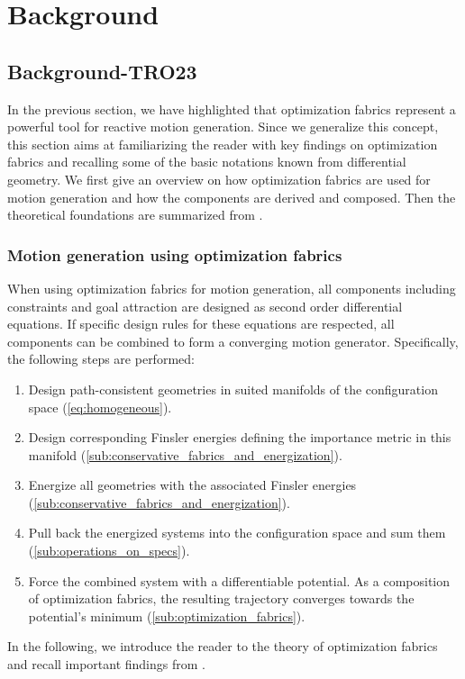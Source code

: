 \chapter{Background} %
\label{cha:background}

\section{Background-TRO23}%
\label{sec:mathematics}

In the previous section, we have highlighted that optimization fabrics represent a
powerful tool for reactive motion generation. Since we generalize this concept, this
section aims at familiarizing the reader with key findings on optimization fabrics and
recalling some of the basic notations known from differential geometry. 
We first give an overview on how optimization fabrics are used for motion generation
and how the components are derived and composed. Then the theoretical foundations
are summarized from \cite{Cheng2020,Ratliff2020}.

\subsection{Motion generation using optimization fabrics}%
\label{sub:trajectory_generation_using_optimization_fabrics}

When using optimization fabrics for motion generation, all components including constraints and 
goal attraction are designed as second order differential equations. If specific design
rules for these equations are respected, all components can be combined to 
form a converging motion generator. Specifically, the following steps are performed:
%
\begin{enumerate}
  \item Design path-consistent geometries in suited manifolds of the configuration space
    (\cref{eq:homogeneous}).
  \item Design corresponding Finsler energies defining the importance metric in this manifold
    (\cref{sub:conservative_fabrics_and_energization}).
  \item Energize all geometries with the associated Finsler energies 
    (\cref{sub:conservative_fabrics_and_energization}).
  \item Pull back the energized systems into the configuration space and sum them 
    (\cref{sub:operations_on_specs}).
  \item Force the combined system with a differentiable potential. As a composition of optimization fabrics, 
    the resulting trajectory converges towards the potential's minimum
    (\cref{sub:optimization_fabrics}).
\end{enumerate}
In the following, we introduce the reader to the theory of optimization fabrics
and recall important findings from \cite{Ratliff2020}.

